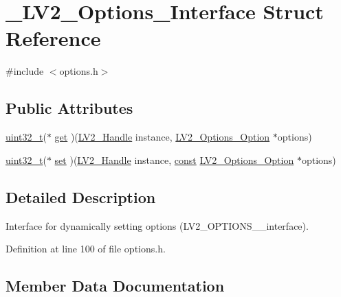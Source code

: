 \hypertarget{struct___l_v2___options___interface}{}\section{\+\_\+\+L\+V2\+\_\+\+Options\+\_\+\+Interface Struct Reference}
\label{struct___l_v2___options___interface}


{\ttfamily \#include $<$options.\+h$>$}

\subsection*{Public Attributes}
\begin{DoxyCompactItemize}
\item 
\hyperlink{lib-src_2ffmpeg_2win32_2stdint_8h_a6eb1e68cc391dd753bc8ce896dbb8315}{uint32\+\_\+t}($\ast$ \hyperlink{struct___l_v2___options___interface_ae2aa36ed629f52be73adacf984b50239}{get} )(\hyperlink{lv2_8h_a95eafb0a5290f30bcdc8c0f8eb992eaf}{L\+V2\+\_\+\+Handle} instance, \hyperlink{lv2_2lv2_2lv2_2lv2plug_8in_2ns_2ext_2options_2options_8h_acbe02f117bfab5e24ee5fb3781334feb}{L\+V2\+\_\+\+Options\+\_\+\+Option} $\ast$options)
\item 
\hyperlink{lib-src_2ffmpeg_2win32_2stdint_8h_a6eb1e68cc391dd753bc8ce896dbb8315}{uint32\+\_\+t}($\ast$ \hyperlink{struct___l_v2___options___interface_a8ebef3778792929fe9473d25d3ce4a4b}{set} )(\hyperlink{lv2_8h_a95eafb0a5290f30bcdc8c0f8eb992eaf}{L\+V2\+\_\+\+Handle} instance, \hyperlink{getopt1_8c_a2c212835823e3c54a8ab6d95c652660e}{const} \hyperlink{lv2_2lv2_2lv2_2lv2plug_8in_2ns_2ext_2options_2options_8h_acbe02f117bfab5e24ee5fb3781334feb}{L\+V2\+\_\+\+Options\+\_\+\+Option} $\ast$options)
\end{DoxyCompactItemize}


\subsection{Detailed Description}
Interface for dynamically setting options (L\+V2\+\_\+\+O\+P\+T\+I\+O\+N\+S\+\_\+\+\_\+interface). 

Definition at line 100 of file options.\+h.



\subsection{Member Data Documentation}
